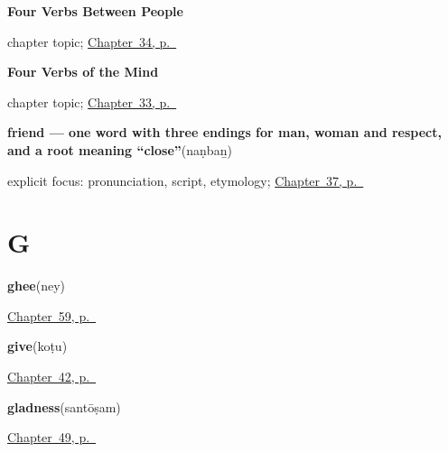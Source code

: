 \noindent\begin{minipage}[t]{\linewidth}
\raggedright
\textbf{Four Verbs Between People}\par
\footnotesize chapter topic; \hyperref[ch:ta-verbs-between-people]{Chapter~34, p.~\pageref*{ch:ta-verbs-between-people}}
\end{minipage}\par\smallskip

\noindent\begin{minipage}[t]{\linewidth}
\raggedright
\textbf{Four Verbs of the Mind}\par
\footnotesize chapter topic; \hyperref[ch:ta-verbs-of-the-mind]{Chapter~33, p.~\pageref*{ch:ta-verbs-of-the-mind}}
\end{minipage}\par\smallskip

\noindent\begin{minipage}[t]{\linewidth}
\raggedright
\textbf{friend — one word with three endings for man, woman and respect, and a root meaning \textquotedblleft{}close\textquotedblright{}}\enspace\emph{}\enspace(naṇbaṉ)\par
\footnotesize explicit focus: pronunciation, script, etymology; \hyperref[ch:ta-your-town-your-friend]{Chapter~37, p.~\pageref*{ch:ta-your-town-your-friend}}
\end{minipage}\par\smallskip

\section*{G}

\noindent\begin{minipage}[t]{\linewidth}
\raggedright
\textbf{ghee}\enspace\emph{}\enspace(ney)\par
\footnotesize \hyperref[ch:ta-in-the-kitchen]{Chapter~59, p.~\pageref*{ch:ta-in-the-kitchen}}
\end{minipage}\par\smallskip

\noindent\begin{minipage}[t]{\linewidth}
\raggedright
\textbf{give}\enspace\emph{}\enspace(koṭu)\par
\footnotesize \hyperref[ch:ta-more-verbs]{Chapter~42, p.~\pageref*{ch:ta-more-verbs}}
\end{minipage}\par\smallskip

\noindent\begin{minipage}[t]{\linewidth}
\raggedright
\textbf{gladness}\enspace\emph{}\enspace(santōṣam)\par
\footnotesize \hyperref[ch:ta-courtesy]{Chapter~49, p.~\pageref*{ch:ta-courtesy}}
\end{minipage}\par\smallskip


